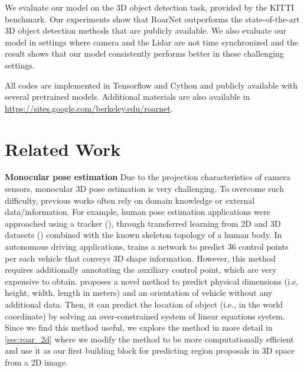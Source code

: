 \documentclass[letterpaper, 10 pt, conference]{ieeeconf}
\newcommand{\subsec}{\quad}
\begin{document}
We evaluate our model on the 3D object detection task, provided by the KITTI benchmark. Our experiments show that RoarNet outperforms the state-of-the-art 3D object detection methods that are publicly available. We also evaluate our model in settings where camera and the Lidar are not time synchronized and the result shows that our model consistently performs better in these challenging settings.

All codes are implemented in Tensorflow and Cython and publicly available with several pretrained models. Additional materials are also available in \url{https://sites.google.com/berkeley.edu/roarnet}.






\section{Related Work}
\textbf{Monocular pose estimation\subsec} Due to the projection characteristics of camera sensors, monocular 3D pose estimation is very challenging. To overcome such difficulty, previous works often rely on domain knowledge or external data/information.
For example, human pose estimation applications were approached using a tracker (\cite{andriluka_monocular_2010}), through transferred learning from 2D and 3D datasets (\cite{mehta2017}) combined with the known skeleton topology of a human body.
In autonomous driving applications, \cite{chabot_deep_2017} trains a network to predict 36 control points per each vehicle that conveys 3D shape information. However, this method requires additionally annotating the auxiliary control point, which are very expensive to obtain. \cite{mousavian_3d_2017} proposes a novel method to predict physical dimensions (i.e, height, width, length in meters) and an orientation of vehicle without any additional data. Then, it can predict the location of object (i.e.,  in the world coordinate) by solving an over-constrained system of linear equations system. Since we find this method useful, we explore the method in more detail in \cref{sec:roar_2d} where we modify the method to be more computationally efficient and use it as our first building block for predicting region proposals in 3D space from a 2D image.
\end{document}
